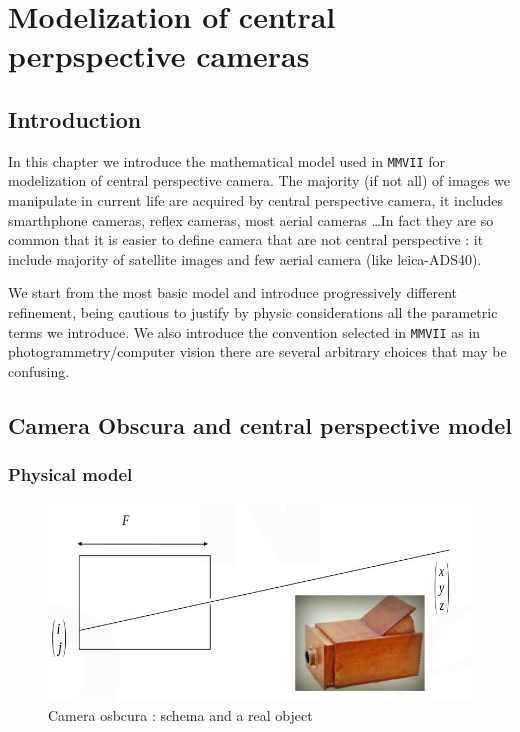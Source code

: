 \chapter{Modelization of central perpspective cameras}



\section{Introduction}

In this chapter we introduce the mathematical model used in {\tt MMVII}
for modelization of central perspective camera.  The majority (if not all)
of images we manipulate in current life are acquired by central perspective camera, it includes
smarthphone cameras,  reflex cameras,  most aerial cameras \dots  In fact they are so common that
it is easier to define camera that are not central  perspective :
it include majority of satellite images and few aerial camera (like leica-ADS40).

We start from the most basic model and introduce progressively different refinement,
being cautious to justify by physic considerations all the parametric terms we introduce.
We also introduce the convention selected in {\tt MMVII} as in photogrammetry/computer vision
there are several arbitrary choices that may be confusing.


\section{Camera Obscura and  central perspective model}

\subsection{Physical model}

\begin{figure}
\centering
\includegraphics[width=12cm]{Methods/Images/CameraObscura.jpg}\caption{Camera osbcura : schema and a real object}
	\label{fig:CameraObscura}
\end{figure}


